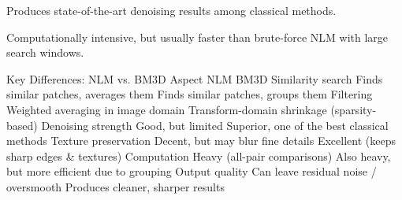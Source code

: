 Produces state-of-the-art denoising results among classical methods.

Computationally intensive, but usually faster than brute-force NLM with large search windows.

Key Differences: NLM vs. BM3D
Aspect	NLM	BM3D
Similarity search	Finds similar patches, averages them	Finds similar patches, groups them
Filtering	Weighted averaging in image domain	Transform-domain shrinkage (sparsity-based)
Denoising strength	Good, but limited	Superior, one of the best classical methods
Texture preservation	Decent, but may blur fine details	Excellent (keeps sharp edges & textures)
Computation	Heavy (all-pair comparisons)	Also heavy, but more efficient due to grouping
Output quality	Can leave residual noise / oversmooth	Produces cleaner, sharper results